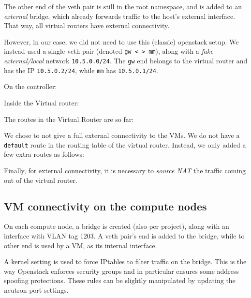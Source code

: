 The other end of the veth pair is still in the root namespace, and is
added to an \emph{external} bridge, which already forwards traffic to
the host's external interface. That way, all virtual routers have
external connectivity.

However, in our case, we did not need to use this (classic) openstack
setup. We instead used a single veth pair (denoted \texttt{gw\
  \textless{}-\textgreater{}\ mm}), along with a \emph{fake
  external/local} network \texttt{10.5.0.0/24}. The \texttt{gw} end
belongs to the virtual router and has the IP \texttt{10.5.0.2/24},
while \texttt{mm} has \texttt{10.5.0.1/24}.

On the controller:


Inside the Virtual router:


The routes in the Virtual Router are so far:


We chose to not give a full external connectivity to the VMs. We do
not have a \texttt{default} route in the routing table of the virtual
router. Instead, we only added a few extra routes as follows:


Finally, for external connectivity, it is necessary to \emph{source
  NAT} the traffic coming out of the virtual router.


\subsection{VM connectivity on the compute nodes}
\label{section:connectivity:compute:nodes}

On each compute node, a bridge is created (also per project), along
with an interface with VLAN tag 1203. A veth pair's end is added to
the bridge, while to other end is used by a VM, as its internal
interface.

A kernel setting is used to force IPtables to filter traffic on the
bridge. This is the way Openstack enforces security groups and in
particular ensures some address spoofing protections. These rules can
be slightly manipulated by updating the neutron port settings.



